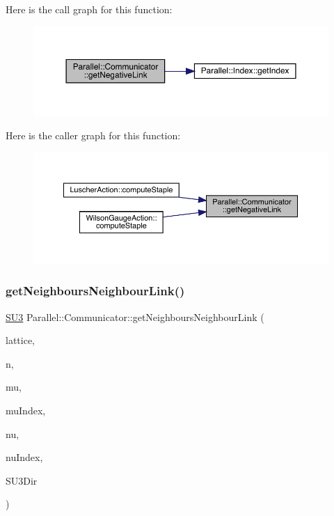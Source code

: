 Here is the call graph for this function\+:\nopagebreak
\begin{figure}[H]
\begin{center}
\leavevmode
\includegraphics[width=350pt]{class_parallel_1_1_communicator_ad3b8781686b517c146d9d2f2dbf932de_cgraph}
\end{center}
\end{figure}
Here is the caller graph for this function\+:\nopagebreak
\begin{figure}[H]
\begin{center}
\leavevmode
\includegraphics[width=350pt]{class_parallel_1_1_communicator_ad3b8781686b517c146d9d2f2dbf932de_icgraph}
\end{center}
\end{figure}
\mbox{\label{class_parallel_1_1_communicator_a453ebde0502ed86b8bd95dede6f8e69c}} 
\subsubsection{\texorpdfstring{getNeighboursNeighbourLink()}{getNeighboursNeighbourLink()}}
{\footnotesize\ttfamily \mbox{\hyperlink{class_s_u3}{S\+U3}} Parallel\+::\+Communicator\+::get\+Neighbours\+Neighbour\+Link (\begin{DoxyParamCaption}\item[{\mbox{\hyperlink{class_lattice}{Lattice}}$<$ \mbox{\hyperlink{class_s_u3}{S\+U3}} $>$ $\ast$}]{lattice,  }\item[{std\+::vector$<$ int $>$}]{n,  }\item[{int}]{mu,  }\item[{int $\ast$}]{mu\+Index,  }\item[{int}]{nu,  }\item[{int $\ast$}]{nu\+Index,  }\item[{int}]{S\+U3\+Dir }\end{DoxyParamCaption})\hspace{0.3cm}{\ttfamily [static]}}

